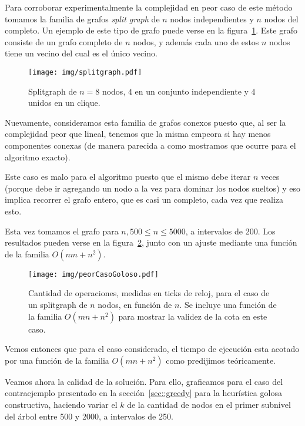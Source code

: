 Para corroborar experimentalmente la complejidad en peor caso de este
m\'etodo tomamos la familia de grafos \textit{split graph} de $n$ nodos
independientes y $n$ nodos del completo. Un ejemplo de este tipo de 
grafo puede verse en la figura~\ref{fig::splitgraph}. Este grafo 
consiste de un grafo completo de $n$ nodos, y adem\'as cada uno de estos
$n$ nodos tiene un vecino del cual es el \'unico vecino.

\begin{figure}[H]
	\caption{Splitgraph de $n = 8$ nodos, $4$ en un conjunto 
	independiente y $4$ unidos en un clique.}
	\label{fig::splitgraph}
	\centering
	\texttt{[image: img/splitgraph.pdf]}
\end{figure} 

Nuevamente, consideramos esta familia de grafos conexos puesto que, al
ser la complejidad peor que lineal, tenemos que la misma empeora si
hay menos componentes conexas (de manera parecida a como mostramos que
ocurre para el algoritmo exacto).

Este caso es malo para el algoritmo puesto que el mismo debe iterar $n$
veces (porque debe ir agregando un nodo a la vez para dominar los nodos 
sueltos) y eso implica recorrer el grafo entero, que es casi un 
completo, cada vez que realiza esto.

Esta vez tomamos el grafo para $n,500 \leq n \leq 5000$, a 
intervalos de 200. Los resultados pueden verse en la 
figura~\ref{fig::peorCasoGoloso}, junto con un ajuste mediante una 
funci\'on de la familia $O(nm + n^2)$.

\begin{figure}[H]
	\caption{Cantidad de operaciones, medidas en ticks de reloj, para el 
	caso de un splitgraph de $n$ nodos, en funci\'on de 
	$n$. Se incluye una funci\'on de la familia $O(mn+n^2)$ para mostrar 
	la validez de la cota en este caso.}
	\label{fig::peorCasoGoloso}
	\centering
	\texttt{[image: img/peorCasoGoloso.pdf]}
\end{figure} 

Vemos entonces que para el caso considerado, el tiempo de ejecuci\'on
esta acotado por una funci\'on de la familia $O(mn+n^2)$ como predijimos
te\'oricamente.

Veamos ahora la calidad de la soluci\'on. Para ello, graficamos para 
el caso del contraejemplo presentado en la secci\'on~\ref{sec::greedy}
para la heur\'istica golosa constructiva, haciendo variar el $k$ de la
cantidad de nodos en el primer subnivel del \'arbol entre 500 y 2000,
a intervalos de 250.

